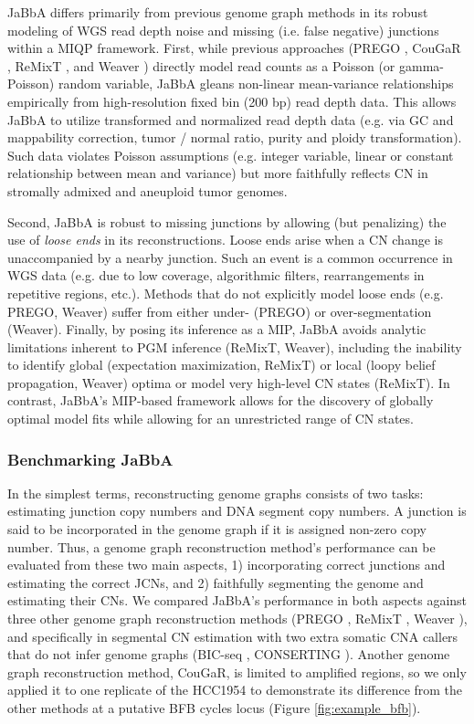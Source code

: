 \documentclass[phd,tocprelim]{cornell}
\begin{document}
JaBbA differs primarily from previous genome graph methods in its robust modeling of WGS read depth noise and missing (i.e. false negative) junctions within a MIQP framework. First, while previous approaches (PREGO \cite{Oesper2012-vw}, CouGaR \cite{Medvedev:2010bm}, ReMixT \cite{McPherson2017-ry}, and Weaver \cite{Li2016-qa}) directly model read counts as a Poisson (or gamma-Poisson) random variable, JaBbA gleans non-linear mean-variance relationships empirically from high-resolution fixed bin (200 bp) read depth data.  This allows JaBbA to utilize transformed and normalized read depth data (e.g. via GC and mappability correction, tumor / normal ratio, purity and ploidy transformation).  Such data violates Poisson assumptions (e.g. integer variable, linear or constant relationship between mean and variance) but more faithfully reflects CN in stromally admixed and aneuploid tumor genomes.

Second, JaBbA is robust to missing junctions by allowing (but penalizing) the use of \textit{loose ends} in its reconstructions.  Loose ends arise when a CN change is unaccompanied by a nearby junction. Such an event is a common occurrence in WGS data (e.g. due to low coverage, algorithmic filters, rearrangements in repetitive regions, etc.). Methods that do not explicitly model loose ends (e.g. PREGO, Weaver) suffer from either under- (PREGO) or over-segmentation (Weaver). Finally, by posing its inference as a MIP, JaBbA avoids analytic limitations inherent to PGM inference (ReMixT, Weaver), including the inability to identify global (expectation maximization, ReMixT) or local (loopy belief propagation, Weaver) optima or model very high-level CN states (ReMixT).  In contrast, JaBbA's MIP-based framework allows for the discovery of globally optimal model fits while allowing for an unrestricted range of CN states.

\subsubsection*{Benchmarking JaBbA}
In the simplest terms, reconstructing genome graphs consists of two tasks: estimating junction copy numbers and DNA segment copy numbers. A junction is said to be incorporated in the genome graph if it is assigned non-zero copy number. Thus, a genome graph reconstruction method's performance can be evaluated from these two main aspects, 1) incorporating correct junctions and estimating the correct JCNs, and 2) faithfully segmenting the genome and estimating their CNs. We compared JaBbA's performance in both aspects against three other genome graph reconstruction methods (PREGO \cite{Oesper2012-vw}, ReMixT \cite{McPherson2017-ry}, Weaver \cite{Li2016-qa}), and specifically in segmental CN estimation with two extra somatic CNA callers that do not infer genome graphs (BIC-seq \cite{Xi2011-oa}, CONSERTING \cite{Chen2015-sw}). Another genome graph reconstruction method, CouGaR, is limited to amplified regions, so we only applied it to one replicate of the HCC1954 to demonstrate its difference from the other methods at a putative BFB cycles locus (Figure \ref{fig:example_bfb}).
\end{document}
